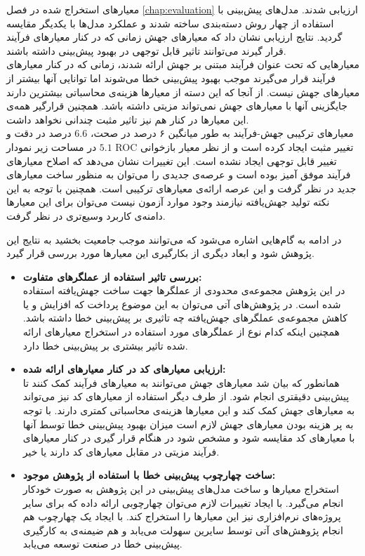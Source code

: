 معیارهای استخراج شده در فصل \ref{chap:evaluation} ارزیابی شدند.  مدل‌های پیش‌بینی با استفاده از  چهار روش دسته‌بندی ساخته شدند و عملکرد مدل‌ها با یکدیگر مقایسه گردید. نتایج ارزیابی نشان داد که معیارهای جهش زمانی که در کنار معیارهای فرآیند قرار گیرند می‌توانند تاثیر قابل توجهی در بهبود پیش‌بینی داشته باشند.\\
 معیارهایی که تحت عنوان فرآیند مبتنی بر جهش ارائه شدند، زمانی که در کنار معیارهای فرآیند قرار می‌گیرند موجب بهبود پیش‌بینی خطا می‌شوند اما توانایی آنها بیشتر از معیارهای جهش نیست. از آنجا که این دسته از معیارها هزینه‌ی محاسباتی بیشترین دارند جایگزینی آنها با معیارهای جهش نمی‌تواند مزیتی داشته باشد. همچنین قرارگیر همه‌ی این معیارها در کنار هم نیز تاثیر مثبت چندانی نخواهد داشت.\\
 معیارهای ترکیبی جهش-فرآیند به طور میانگین ۶ درصد در صحت، $6.6$ درصد در دقت و $5.1$ در مساحت زیر نمودار ROC تغییر مثبت ایجاد کرده است و از نظر معیار بازخوانی تغییر قابل توجهی ایجاد نشده است. این تغییرات نشان می‌دهد که اصلاح  معیارهای فرآیند موفق آمیز بوده است و عرصه‌ی جدیدی را می‌توان به منظور ساخت معیارهای جدید در نظر گرفت و این عرصه ارائه‌ی معیارهای ترکیبی است. همچنین با توجه به این نکته تولید جهش‌یافته نیازمند وجود موارد آزمون نیست می‌توان برای این معیارها دامنه‌ی کاربرد وسیع‌تری در نظر گرفت. 

در ادامه به گام‌هایی اشاره می‌شود که می‌توانند موجب جامعیت بخشید به نتایج این پژوهش شود و ابعاد دیگری از بکارگیری این معیارها  مورد بررسی قرار گیرد.

\begin{itemize}
	\item
	\textbf{بررسی تاثیر استفاده از عملگرهای متفاوت:}\\
	در این پژوهش مجموعه‌ی محدودی از عملگرها جهت ساخت جهش‌یافته استفاده شده است. در پژوهش‌های آتی می‌توان به این موضوع پرداخت که افزایش و یا  کاهش مجموعه‌ی عملگرهای جهش‌یافته چه تاثیری بر پیش‌بینی خطا داشته باشد. همچنین اینکه کدام نوع از عملگرهای مورد استفاده در استخراج معیارهای ارائه شده تاثیر بیشتری بر پیش‌بینی خطا دارد. 
	\item
	\textbf{ارزیابی معیارهای کد در کنار معیارهای ارائه شده:}\\
همانطور که بیان شد معیارهای جهش می‌توانند به معیارهای فرآیند کمک کنند تا پیش‌بینی دقیقتری انجام شود. از طرف دیگر استفاده از معیارهای کد نیز می‌تواند به معیارهای جهش کمک کند و این معیارها هزینه‌ی محاسباتی کمتری دارند. با توجه به پر هزینه بودن معیارهای جهش لازم است میزان بهبود پیش‌بینی  خطا توسط آنها با معیارهای کد مقایسه شود و مشخص شود  در هنگام قرار گیری در کنار معیارهای فرآیند مزیتی در مقابل معیارهای کد دارند یا خیر. 
\item
\textbf{ساخت چهارچوب پیش‌بینی خطا با استفاده از پژوهش موجود:}\\
استخراج معیارها و ساخت مدل‌های پیش‌بینی در این پژوهش به صورت خودکار انجام می‌گیرد. با ایجاد تغییرات لازم می‌توان چهارچوبی ارائه داده که برای سایر پروژه‌های نرم‌افزاری نیز این معیارها را استخراج کند. با ایجاد یک چهارچوب هم انجام پژوهش‌های آتی توسط سایرین سهولت می‌یابد و هم ضیمنه‌ی به کارگیری پیش‌بینی خطا در صنعت توسعه می‌یابد. 
	
	
\end{itemize}




